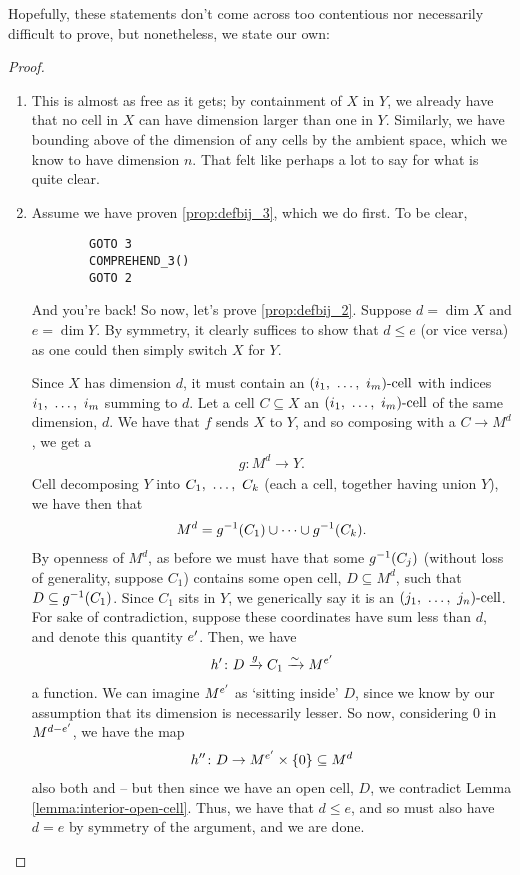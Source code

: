 Hopefully, these statements don't come across too contentious nor necessarily difficult to prove, but nonetheless, we state our own:
\begin{proof}
  \leavevmode
  \begin{enumerate}

    \item This is almost as free as it gets; by containment of $X$ in $Y$, we already have that no cell in $X$ can have dimension larger than one in $Y$. Similarly, we have bounding above of the dimension of any cells by the ambient space, which we know to have dimension $n$. That felt like perhaps a lot to say for what is quite clear.

    \item Assume we have proven \ref{prop:defbij_3}, which we do first. To be clear, 
      \begin{verbatim}
        GOTO 3
        COMPREHEND_3()
        GOTO 2
      \end{verbatim}
    And you're back! So now, let's prove \ref{prop:defbij_2}. Suppose $d = \dim{X}$ and $e = \dim{Y}$. By symmetry, it clearly suffices to show that $d \leq e$ (or vice versa) as one could then simply switch $X$ for $Y$.

    Since $X$ has dimension $d$, it must contain an $(i_1, \ \hdots, \ i_{m})\textrm{-cell}$ with indices $i_1, \ \hdots, \ i_{m}$ summing to $d$. Let a cell $C \subseteq X$ an $(i_1, \ \hdots, \ i_{m})\textrm{-cell}$ of the same dimension, $d$. We have that $f$ sends $X$ to $Y$, and so composing with a  \bij $C \to M^d$, we get a  \injtion
    \begin{align*}
      g \colon M^d \to Y.
    \end{align*}
    Cell decomposing $Y$ into $C_1, \ \hdots, \ C_{k}$ (each a cell, together having union $Y$), we have then that
    \begin{align*}
      M^d = g^{-1}(C_1) \cup \cdots \cup g^{-1}(C_k).
    \end{align*}
    By openness of $M^d$, as before we must have that some $g^{-1}(C_j)$ (without loss of generality, suppose $C_1$) contains some open cell, $D \subseteq M^d$, such that $D \subseteq g^{-1}(C_1)$. Since $C_1$ sits in $Y$, we generically say it is an $(j_1, \ \hdots, \ j_{n})\textrm{-cell}$. For sake of contradiction, suppose these coordinates have sum less than $d$, and denote this quantity $e^{\prime}$. Then, we have
    \begin{align*}
      h^{\prime} \colon D \xrightarrow{g} C_1 \xrightarrow{\sim} M^{e^{\prime}}
    \end{align*}
    a  \inj function. We can imagine $M^{e^{\prime}}$ as `sitting inside' $D$, since we know by our assumption that its dimension is necessarily lesser. So now, considering $0$ in $M^{d - e^{\prime}}$, we have the map
    \begin{align*}
      h^{\prime \prime} \colon D \to M^{e^{\prime}} \times \left\{ 0 \right\} \subseteq M^d
    \end{align*}
    also both  and \inj -- but then since we have an open cell, $D$, we contradict Lemma \ref{lemma:interior-open-cell}. Thus, we have that $d \leq e$, and so must also have $d = e$ by symmetry of the argument, and we are done.


\end{enumerate}
\end{proof}
